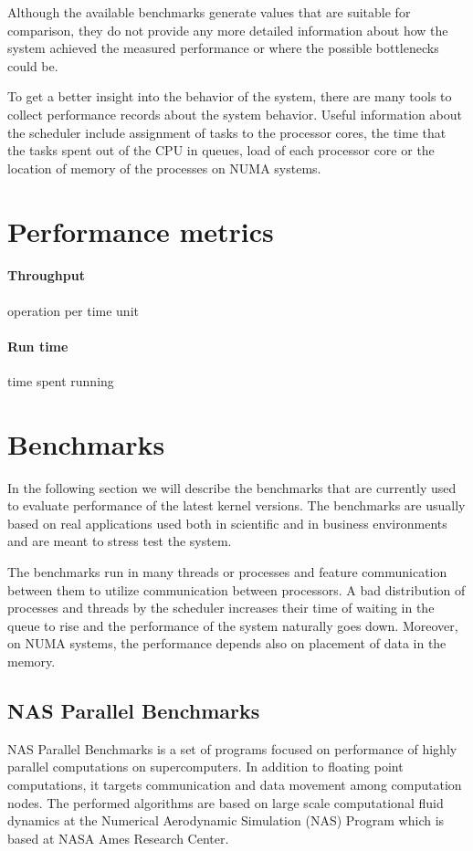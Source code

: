 Although the available benchmarks generate values that are suitable for comparison, they
do not provide any more detailed information about how the system achieved the
measured performance or where the possible bottlenecks could be.

To get a better insight into the behavior of the system, there are many tools to
collect performance records about the system behavior. Useful information about the
scheduler include assignment of tasks to the processor cores, the time that the
tasks spent out of the CPU in queues, load of each processor core or the
location of memory of the processes on NUMA systems.

\section{Performance metrics}
\paragraph{Throughput} operation per time unit
\paragraph{Run time} time spent running

\section{Benchmarks}
In the following section we will describe the benchmarks that are currently used
to evaluate performance of the latest kernel versions. The benchmarks are
usually based on real applications used both in scientific and in business
environments and are meant to stress test the system.

The benchmarks run in many threads or processes and feature communication
between them to utilize communication between processors. A bad distribution of
processes and threads by the scheduler increases their time of waiting in the
queue to rise and the performance of the system naturally goes down. Moreover,
on NUMA systems, the performance depends also on placement of data in the
memory.

\subsection{NAS Parallel Benchmarks}
NAS Parallel Benchmarks\;\cite{nas-parallel} is a set of programs focused on
performance of highly parallel computations on supercomputers. In addition to
floating point computations, it targets communication and data movement among
computation nodes. The performed algorithms are based on large scale
computational fluid dynamics at the Numerical Aerodynamic Simulation (NAS)
Program which is based at NASA Ames Research Center.


